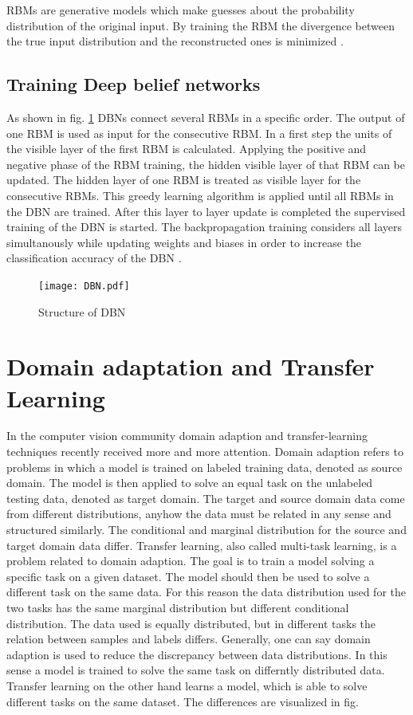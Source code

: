 RBMs are generative models which make guesses about the probability distribution of the original input. By training the RBM the divergence between the true input distribution and the reconstructed ones is minimized \cite{Hinton2010}.

\subsection{Training Deep belief networks}
As shown in fig. \ref{fig:DBN} DBNs connect several RBMs in a specific order. The output of one RBM is used as input for the consecutive RBM. In a first step the units of the visible layer of the first RBM is calculated. Applying the positive and negative phase of the RBM training, the hidden visible layer of that RBM can be updated. The hidden layer of one RBM is treated as visible layer for the consecutive RBMs. This greedy learning algorithm is applied until all RBMs in the DBN are trained. After this layer to layer update is completed the supervised training of the DBN is started. The backpropagation training considers all layers simultanously while updating weights and biases in order to increase the classification accuracy of the DBN \cite{Zhang2017}.

\begin{figure}[htpb]
  \centering
  \texttt{[image: DBN.pdf]}
  \caption {Structure of DBN \cite{Zhang2017}} \label{fig:DBN}
\end{figure}
\FloatBarrier 

\section{Domain adaptation and Transfer Learning}

In the computer vision community domain adaption and transfer-learning techniques recently received more and more attention. Domain adaption refers to problems in which a model is trained on labeled training data, denoted as source domain. The model is then applied to solve an equal task on the unlabeled testing data, denoted as target domain. The target and source domain data come from different distributions, anyhow the data must be related in any sense and structured similarly. The conditional and marginal distribution for the source and target domain data differ. Transfer learning, also called multi-task learning, is a problem related to domain adaption. The goal is to train a model solving a specific task on a given dataset. The model should then be used to solve a different task on the same data. For this reason the data distribution used for the two tasks has the same marginal distribution but different conditional distribution. The data used is equally distributed, but in different tasks the relation between samples and labels differs. Generally, one can say domain adaption is used to reduce the discrepancy between data distributions. In this sense a model is trained to solve the same task on differntly distributed data. Transfer learning on the other hand learns a model, which is able to solve different tasks on the same dataset. The differences are visualized in fig. \label{fig:domain_adaption_vs_transfer_learning}

